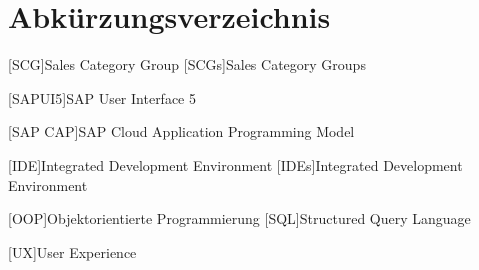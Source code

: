 \chapter*{Abkürzungsverzeichnis}
\begin{acronym}
    [SCG]{Sales Category Group} 
    [SCGs]{Sales Category Groups}
\end{acronym}

\begin{acronym}
    [SAPUI5]{SAP User Interface 5}
\end{acronym}

\begin{acronym}
    [SAP CAP]{SAP Cloud Application Programming Model}
\end{acronym}

\begin{acronym}
    [IDE]{Integrated Development Environment}
    [IDEs]{Integrated Development Environment}
\end{acronym}

\begin{acronym}
    [OOP]{Objektorientierte Programmierung}
    [SQL]{Structured Query Language}
\end{acronym}

\begin{acronym}
    [UX]{User Experience}
\end{acronym}